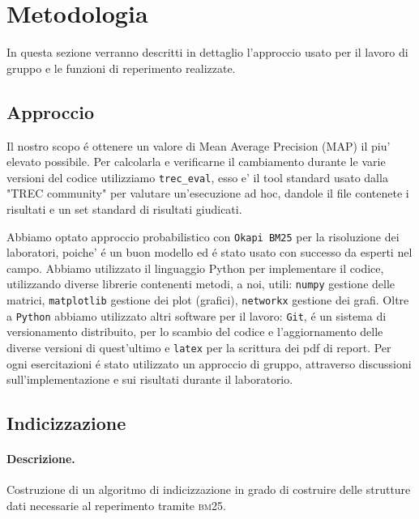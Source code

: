\section{Metodologia}
\label{sec:metodologia}

In questa sezione verranno descritti in dettaglio l'approccio usato per il lavoro di gruppo e le funzioni di reperimento realizzate.


\subsection{Approccio}
\label{sec:approccio}

Il nostro scopo \'e ottenere un valore di Mean Average Precision (\textsc{MAP}) il piu' elevato possibile. Per calcolarla e verificarne il cambiamento durante le varie versioni del codice utilizziamo \texttt{trec\_eval}, esso e' il tool standard usato dalla "TREC community" per valutare un'esecuzione ad hoc, dandole il file contenete i risultati e un set standard di risultati giudicati.  

Abbiamo optato approccio probabilistico con \texttt{Okapi BM25} per la risoluzione dei laboratori, poiche' \'e un buon modello ed \'e stato usato con successo da esperti nel campo.  
Abbiamo utilizzato il linguaggio Python per implementare il codice, utilizzando diverse librerie contenenti metodi, a noi, utili: \texttt{numpy} gestione delle matrici, \texttt{matplotlib} gestione dei plot (grafici), \texttt{networkx} gestione dei grafi.
Oltre a \texttt{Python} abbiamo utilizzato altri software per il lavoro: \texttt{Git}, \'e un sistema di versionamento distribuito, per lo scambio del codice e l'aggiornamento delle diverse versioni di quest'ultimo e \texttt{latex} per la scrittura dei pdf di report.
Per ogni esercitazioni \'e stato utilizzato un approccio di gruppo, attraverso discussioni sull'implementazione e sui risultati durante il laboratorio.

\subsection{Indicizzazione} \label{sec:metodi-di-indic}

\paragraph{\textbf{Descrizione.}} 
Costruzione di un algoritmo di indicizzazione in grado di costruire delle strutture dati necessarie al reperimento tramite \textsc{bm25}. 

